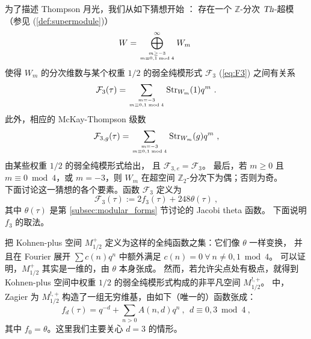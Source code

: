 \documentclass[11pt,a4paper,fontset=windows]{ctexart}
\numberwithin{equation}{section}
\newcommand{\Th}{\operatorname{\textsl{Th}}}      %
\newcommand{\CC}{\mathbb{C}}
\newcommand{\ZZ}{\mathbb{Z}}
\newcommand{\str}{\operatorname{Str}}
\newcommand{\eq}[1]{(\ref{#1})}
\begin{document}

为了描述 Thompson 月光，我们从如下猜想开始 \cite{Harvey:2015mca}：
{\conj \label{conj:thompson} 存在一个 $\ZZ$-分次 $\Th$-超模（参见 \eq{def:supermodule}）
\begin{equation}
W=\bigoplus_{m\geq-3\atop m\equiv0,1\bmod4}^\infty W_m~
\end{equation}
使得 $W_m$ 的分次维数与某个权重 $1/2$ 的弱全纯模形式 $\mathcal{F}_3$ (\ref{eq:F3}) 之间有关系
\begin{equation}
\mathcal{F}_3(\tau)=\sum_{m=-3\atop m\equiv0,1\bmod4}{\str}_{W_m}(1)q^m~.
\end{equation}
此外，相应的 McKay-Thompson 级数
\begin{equation}
\mathcal{F}_{3,g}(\tau)=\sum_{m=-3\atop m\equiv0,1\bmod4}{\str}_{W_m}(g)q^m~,
\end{equation}
由某些权重 $1/2$ 的弱全纯模形式给出，
且 $\mathcal{F}_{3,e}=\mathcal{F}_3$。
最后，若 $m\geq0$ 且 $m\equiv0\bmod4$，或 $m=-3$，则 $W_m$ 在超空间 $\ZZ_2$-分次下为偶；否则为奇。
}\\

\noindent 下面讨论这一猜想的各个要素。函数 $\mathcal{F}_3$ 定义为
\begin{equation}
\label{eq:F3}
\mathcal{F}_3(\tau):=2f_3(\tau)+248\theta(\tau)~,
\end{equation}
其中 $\theta(\tau)$ 是第 \ref{subsec:modular_forms} 节讨论的 Jacobi theta 函数。
下面说明 $f_3$ 的取法。

把 Kohnen-plus 空间 $M_{1/2}^+$ 定义为这样的全纯函数之集：它们像 $\theta$ 一样变换，
并且在 Fourier 展开 $\sum c(n)q^n$ 中额外满足 $c(n)=0~\forall~n\neq0,1\bmod4$。
可以证明，$M_{1/2}^+$ 其实是一维的，由 $\theta$ 本身张成。
然而，若允许尖点处有极点，就得到 Kohnen-plus 空间中权重 $1/2$ 的弱全纯模形式构成的非平凡空间 $M_{1/2}^{!,+}$。
\cite{Zag_TrcSngMdl} 中，Zagier 为 $M_{1/2}^{!,+}$ 构造了一组无穷维基，由如下（唯一的）函数张成：
\begin{equation}
f_d(\tau)=q^{-d}+\sum_{n>0}A(n,d)q^n~,~~d\equiv0,3\bmod4~,
\end{equation}
其中 $f_0=\theta$。这里我们主要关心 $d=3$ 的情形。

\end{document}
